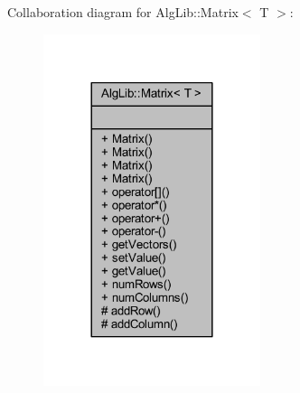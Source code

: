 Collaboration diagram for Alg\+Lib\+:\+:Matrix$<$ T $>$\+:\nopagebreak
\begin{figure}[H]
\begin{center}
\leavevmode
\includegraphics[width=180pt]{class_alg_lib_1_1_matrix__coll__graph}
\end{center}
\end{figure}
